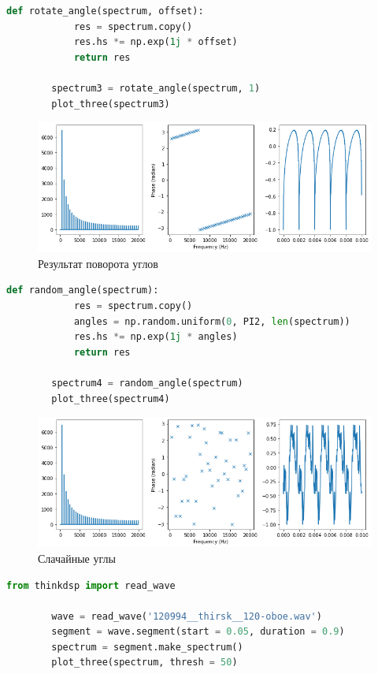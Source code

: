 \documentclass[a4paper, 12pt]{report}
\begin{document}
	\begin{lstlisting}[language=Python,caption=Функция для поворота углов]
		def rotate_angle(spectrum, offset):
			res = spectrum.copy()
			res.hs *= np.exp(1j * offset)
			return res
		
		spectrum3 = rotate_angle(spectrum, 1)
		plot_three(spectrum3)
	\end{lstlisting}
	\begin{figure}[H]
		\centering
		\includegraphics[width=1.0\textwidth]{test6.png}
		\caption{Результат поворота углов}
		\label{fig:test6}
	\end{figure}
	\begin{lstlisting}[language=Python,caption=Функция для генерации случайных углов]
		def random_angle(spectrum):
			res = spectrum.copy()
			angles = np.random.uniform(0, PI2, len(spectrum))
			res.hs *= np.exp(1j * angles)
			return res

		spectrum4 = random_angle(spectrum)
		plot_three(spectrum4)
	\end{lstlisting}
	\begin{figure}[H]
		\centering
		\includegraphics[width=1.0\textwidth]{test7.png}
		\caption{Слачайные углы}
		\label{fig:test7}
	\end{figure}
	\begin{lstlisting}[language=Python,caption=Исходный сигнал]
		from thinkdsp import read_wave

		wave = read_wave('120994__thirsk__120-oboe.wav')
		segment = wave.segment(start = 0.05, duration = 0.9)
		spectrum = segment.make_spectrum()
		plot_three(spectrum, thresh = 50)
	\end{lstlisting}
\end{document}
